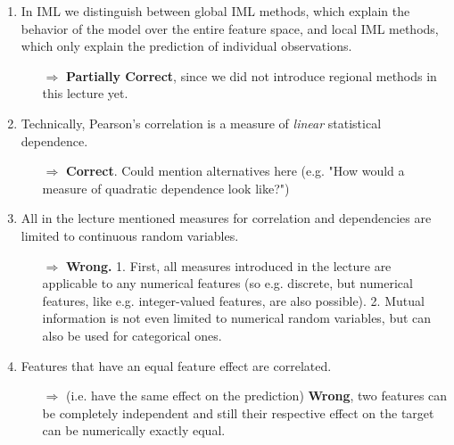 \begin{enumerate}
\begin{itemize}
    	\end{itemize}
    	\item In IML we distinguish between global IML methods, which explain the behavior of the model over the entire feature space, and local IML methods, which only explain the prediction of individual observations. 
    	\begin{itemize}
    		\item[$\Rightarrow$] \textbf{Partially Correct}, since we did not introduce regional methods in this lecture yet.
    	\end{itemize}
        \item Technically, Pearson's correlation is a measure of \textit{linear} statistical dependence. 
        \begin{itemize}
        	\item[$\Rightarrow$] \textbf{Correct}. Could mention alternatives here (e.g. "How would a measure of quadratic dependence look like?")
        \end{itemize}
    	\item All in the lecture mentioned measures for correlation and dependencies are limited to continuous random variables.
    	\begin{itemize}
    		\item[$\Rightarrow$] \textbf{Wrong.} 1. First, all measures introduced in the lecture are applicable to any numerical features (so e.g. discrete, but numerical features, like e.g. integer-valued features, are also possible). 2. Mutual information is not even limited to numerical random variables, but can also be used for categorical ones.
    	\end{itemize}
        \item Features that have an equal feature effect are correlated. 
        \begin{itemize}
        	\item[$\Rightarrow$] (i.e. have the same effect on the prediction) \textbf{Wrong}, two features can be completely independent and still their respective effect on the target can be numerically exactly equal.

\end{itemize}
\end{enumerate}
